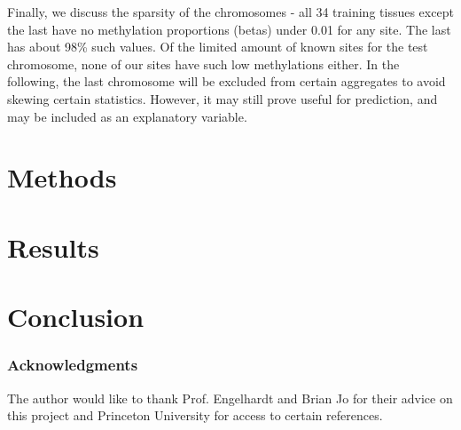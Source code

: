 \documentclass{article} %
\begin{document}
Finally, we discuss the sparsity of the chromosomes - all 34 training tissues except the last have no methylation proportions (betas) under 0.01 for any site. The last has about 98\% such values. Of the limited amount of known sites for the test chromosome, none of our sites have such low methylations either. In the following, the last chromosome will be excluded from certain aggregates to avoid skewing certain statistics. However, it may still prove useful for prediction, and may be included as an explanatory variable.

\section{Methods}


\section{Results}

\section{Conclusion}


\subsubsection*{Acknowledgments}

The author would like to thank Prof. Engelhardt and Brian Jo for their advice on this project and Princeton University for access to certain references.



\end{document}
